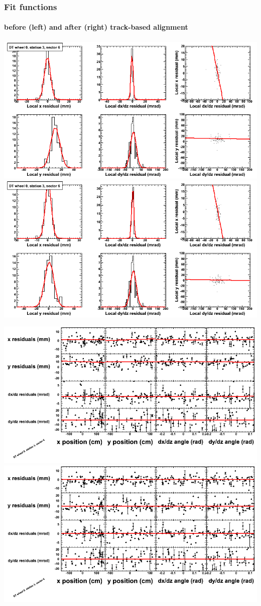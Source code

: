 \documentclass[compress]{beamer}
\begin{document}
\begin{frame}
\frametitle{Fit functions}
\framesubtitle{before (left) and after (right) track-based alignment}
\includegraphics[width=0.5\linewidth]{fitfunctions_re01/MBwhCst3sec06_bellcurves.png} \includegraphics[width=0.5\linewidth]{fitfunctions_re05/MBwhCst3sec06_bellcurves.png}

\includegraphics[width=0.5\linewidth]{fitfunctions_re01/MBwhCst3sec06_polynomials.png} \includegraphics[width=0.5\linewidth]{fitfunctions_re05/MBwhCst3sec06_polynomials.png}
\end{frame}
\end{document}
